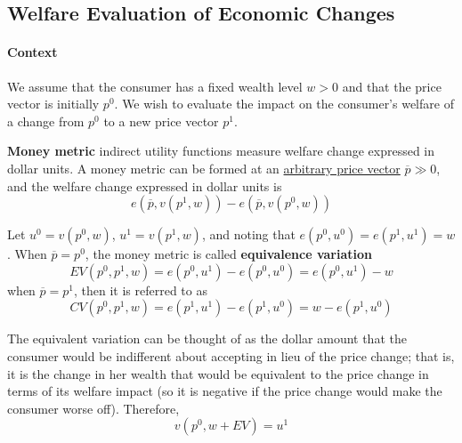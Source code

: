 \documentclass{report}
\begin{document}
 		\subsection{Welfare Evaluation of Economic Changes}
 			\paragraph{Context}We assume that the consumer has a fixed wealth level $w > 0$ and that the price vector is initially $p^0$. We wish to evaluate the impact on the consumer's welfare of a change from $p^0$ to a new price vector $p^1$.
 			
 			\begin{definition}
 				\textbf{Money metric} indirect utility functions measure welfare change expressed in dollar units. A money metric can be formed at an \ul{arbitrary price vector} $\overline{p} \gg 0$, and the welfare change expressed in dollar units is
 				\begin{equation}
 					e\left(\overline{p}, v\left(p^{1}, w\right)\right)-e\left(\overline{p}, v\left(p^{0}, w\right)\right)
 				\end{equation}
 			\end{definition}
 			
 			\begin{definition}
 				Let $u^0 = v(p^0, w)$, $u^1 = v(p^1, w)$, and noting that $e(p^0, u^0) = e(p^1, u^1) = w$.
 				When $\overline{p} = p^0$, the money metric is called \textbf{equivalence variation}
 				\begin{equation}
 					EV \left(p^{0}, p^{1}, w\right)=e\left(p^{0}, u^{1}\right)-e\left(p^{0}, u^{0}\right)=e\left(p^{0}, u^{1}\right)-w
 				\end{equation}
 				when $\overline{p} = p^1$, then it is referred to as
 				\begin{equation}
 					CV\left(p^{0}, p^{1}, w\right)=e\left(p^{1}, u^{1}\right)-e\left(p^{1}, u^{0}\right)=w-e\left(p^{1}, u^{0}\right)
 				\end{equation}
 			\end{definition}
 			
 			\begin{remark}[Interpretation of EV]
 				The equivalent variation can be thought of as the dollar amount that the consumer would be indifferent about accepting in lieu of the price change; that is, it is the change in her wealth that would be equivalent to the price change in terms of its welfare impact (so it is negative if the price change would make the consumer worse off). Therefore,
 				\begin{equation}
 					v(p^0, w+EV) = u^1
 				\end{equation}
 			\end{remark}
 			
\end{document}
